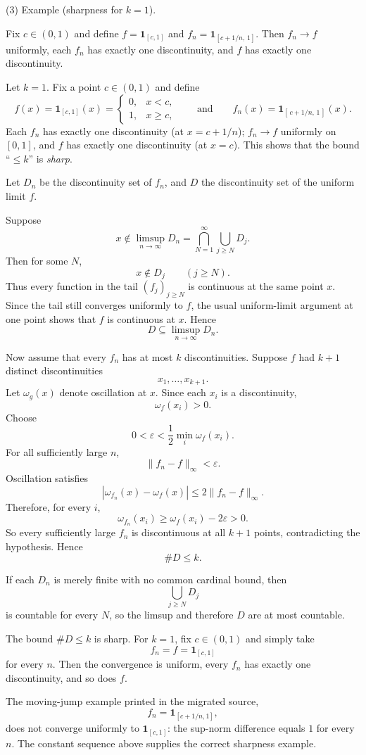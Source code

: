 \begin{problem}[CP-II-0440]
(3) Example (sharpness for $k=1$).

Fix $c\in(0,1)$ and define $f=\mathbf{1}_{[c,1]}$ and $f_n=\mathbf{1}_{[c+1/n,\,1]}$.
Then $f_n\to f$ uniformly, each $f_n$ has exactly one discontinuity, and $f$ has exactly one discontinuity.

Let $k=1$. Fix a point $c\in(0,1)$ and define
\[
f(x) = \mathbf{1}_{[c,1]}(x) =
\begin{cases}
	0, & x < c,\\
	1, & x \ge c,
\end{cases}
\qquad\text{and}\qquad
f_n(x) = \mathbf{1}_{[\,c+1/n,\,1\,]}(x).
\]
Each $f_n$ has exactly one discontinuity (at $x=c+1/n$);
$f_n \to f$ uniformly on $[0,1]$,
and $f$ has exactly one discontinuity (at $x=c$).
This shows that the bound ``$\le k$'' is \emph{sharp}.
\end{problem}

\begin{solution}
Let \(D_n\) be the discontinuity set of \(f_n\), and \(D\) the discontinuity set of the
uniform limit \(f\).

Suppose
\[
x\notin
\limsup_{n\to\infty}D_n
=
\bigcap_{N=1}^{\infty}\bigcup_{j\ge N}D_j.
\]
Then for some \(N\),
\[
x\notin D_j
\qquad(j\ge N).
\]
Thus every function in the tail \((f_j)_{j\ge N}\) is continuous at the same point \(x\).
Since the tail still converges uniformly to \(f\), the usual uniform-limit argument at one
point shows that \(f\) is continuous at \(x\). Hence
\[
\boxed{
D
\subseteq
\limsup_{n\to\infty}D_n.
}
\]

Now assume that every \(f_n\) has at most \(k\) discontinuities. Suppose \(f\) had
\(k+1\) distinct discontinuities
\[
x_1,\ldots,x_{k+1}.
\]
Let \(\omega_g(x)\) denote oscillation at \(x\). Since each \(x_i\) is a discontinuity,
\[
\omega_f(x_i)>0.
\]
Choose
\[
0<\varepsilon
<
\frac12
\min_i\omega_f(x_i).
\]
For all sufficiently large \(n\),
\[
\|f_n-f\|_\infty<\varepsilon.
\]
Oscillation satisfies
\[
|\omega_{f_n}(x)-\omega_f(x)|
\le
2\|f_n-f\|_\infty.
\]
Therefore, for every \(i\),
\[
\omega_{f_n}(x_i)
\ge
\omega_f(x_i)-2\varepsilon
>
0.
\]
So every sufficiently large \(f_n\) is discontinuous at all \(k+1\) points, contradicting the
hypothesis. Hence
\[
\boxed{
\#D\le k.
}
\]

If each \(D_n\) is merely finite with no common cardinal bound, then
\[
\bigcup_{j\ge N}D_j
\]
is countable for every \(N\), so the limsup and therefore \(D\) are at most countable.

The bound \(\#D\le k\) is sharp. For \(k=1\), fix \(c\in(0,1)\) and simply take
\[
f_n=f=\mathbf1_{[c,1]}
\]
for every \(n\). Then the convergence is uniform, every \(f_n\) has exactly one
discontinuity, and so does \(f\).

The moving-jump example printed in the migrated source,
\[
f_n=\mathbf1_{[c+1/n,1]},
\]
does not converge uniformly to \(\mathbf1_{[c,1]}\): the sup-norm difference equals \(1\)
for every \(n\). The constant sequence above supplies the correct sharpness example.
\end{solution}


